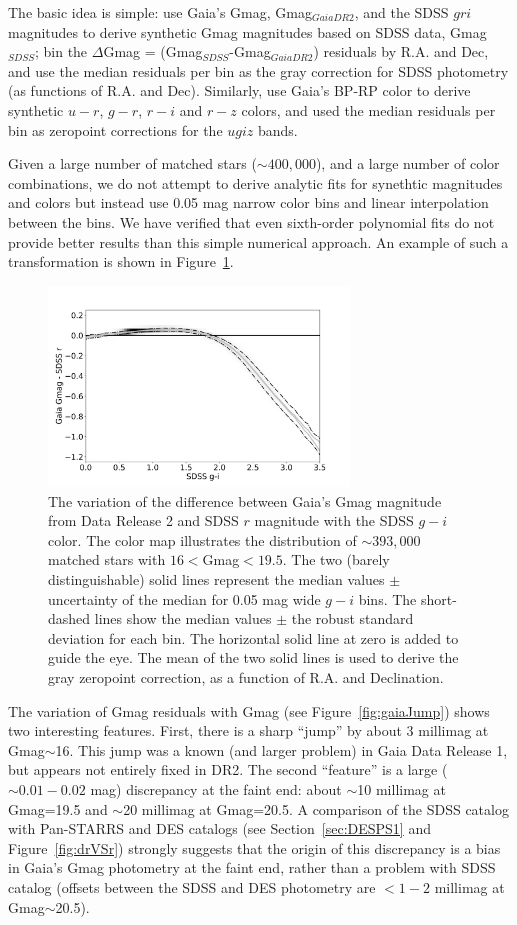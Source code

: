 The basic idea is simple: use Gaia's Gmag, Gmag$_{GaiaDR2}$, and the SDSS $gri$ magnitudes
to derive synthetic Gmag magnitudes based on SDSS data, Gmag$_{SDSS}$; bin the 
$\Delta$Gmag = (Gmag$_{SDSS}$-Gmag$_{GaiaDR2}$) residuals by R.A. and Dec, and 
use the median residuals per bin as the gray correction for SDSS photometry (as functions
of R.A. and Dec). Similarly, use Gaia's BP-RP color to derive synthetic $u-r$, $g-r$, $r-i$
and $r-z$ colors, and used the median residuals per bin as zeropoint corrections for 
the $ugiz$ bands. 

Given a large number of matched stars ($\sim 400,000$), and a large number of color combinations,
we do not attempt to derive analytic fits for synethtic magnitudes and colors but instead
use 0.05 mag narrow color bins and linear interpolation between the bins. We have verified
that even sixth-order polynomial fits do not provide better results than this simple 
numerical approach. An example of such a transformation is shown in Figure~\ref{fig:GrVSgi}. 


\begin{figure}[th!]
  \centering\includegraphics[width=8cm]{figures/GrVSgi.png} 
\caption{The variation of the difference between Gaia's Gmag magnitude from Data Release 2
and SDSS $r$ magnitude with the SDSS $g-i$ color.
The  color map illustrates the distribution of $\sim 393,000$ matched stars with 
$16<$Gmag$<19.5$. The two (barely distinguishable) solid lines represent the median 
values $\pm$ uncertainty of the median for 0.05 mag wide $g-i$ bins. The short-dashed 
lines show the median values $\pm$ the robust standard deviation for 
each bin. The horizontal solid line at zero is added to guide the eye. The mean of 
the two solid lines is used to derive the gray zeropoint correction, as a function of R.A.
and Declination.}
\label{fig:GrVSgi}
\end{figure}


The variation of Gmag residuals with Gmag (see Figure~\ref{fig:gaiaJump}) shows two 
interesting features. First, there is a sharp
``jump'' by about 3 millimag at Gmag$\sim$16.  This jump was a known (and 
larger problem) in Gaia Data Release 1, but appears not entirely fixed in DR2. The 
second ``feature'' is a large ($\sim0.01-0.02$ mag) discrepancy at the faint end:
about $\sim$10 millimag at Gmag=19.5 and $\sim$20 millimag at Gmag=20.5. 
A comparison of the SDSS catalog with Pan-STARRS and DES catalogs (see 
Section~\ref{sec:DESPS1} and Figure~\ref{fig:drVSr}) strongly suggests that the
origin of this discrepancy is a bias in Gaia's Gmag photometry at the faint end, rather 
than a problem with SDSS catalog (offsets between the SDSS and DES
photometry are $<1-2$ millimag at Gmag$\sim$20.5). 
 

